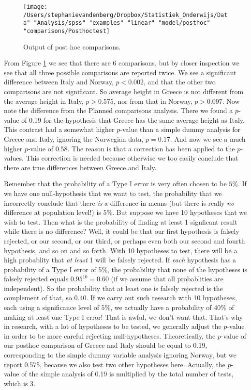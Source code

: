 \begin{figure}[h]
    \begin{center}
       \texttt{[image: /Users/stephanievandenberg/Dropbox/Statistiek\_Onderwijs/Data" "Analysis/spss" "examples" "linear" "model/posthoc" "comparisons/Posthoctest]}
    \end{center}
    \label{fig:Posthoctest}
    \caption{Output of post hoc comparisons.}
\end{figure}

From Figure \ref{fig:Posthoctest} we see that there are 6 comparisons, but by closer inspection we see that all three possible comparisons are reported twice. We see a significant difference between Italy and Norway, $p<0.002$, and that the other two comparisons are not significant. So average height in Greece is not different from the average height in Italy, $p>0.575$, nor from that in Norway, $p>0.097$.
Now note the difference from the Planned comparisons analysis. There we found a $p$-value of 0.19 for the hypothesis that Greece has the same average height as Italy. This contrast had a somewhat higher $p$-value than a simple dummy analysis for Greece and Italy, ignoring the Norwegian data, $p=0.17$. And now we see a much higher $p$-value of 0.58. The reason is that a correction has been applied to the $p$-values. This correction is needed because otherwise we too easily conclude that there are true differences between Greece and Italy.

Remember that the probability of a Type I error is very often chosen to be $5\%$. If we have one null-hypothesis that we want to test, the probability that we incorrectly conclude that there \textit{is} a difference in means (but there is really \textit{no} difference at population level!) is $5\%$. But suppose we have 10 hypotheses that we wish to test. Then what is the probability of finding at least 1 signficant result while there is no difference? Well, it could be that our first hypothesis is falsely rejected, or our second, or our third, or perhaps even both our second and fourth hypothesis, and so on and so forth. With 10 hypotheses to test, there will be a high probablity that \textit{at least} 1 will be falsely rejected. If \textit{each} hypothesis has a probability of a Type I error of 5\%, the probability that none of the hypotheses is falsely rejected equals $0.95^10=0.60$ (if we assume that all probablities are independent). So the probability that at least one is falsely rejected is the complement of that, so 0.40. If we carry out such research with 10 hypotheses, each using a significance level of $5\%$, we actually have a probability of 40\% of making at least one Type I error! That is awful, we don't want that. That's why in research, with a lot of hypotheses to be tested, we generally adjust the $p$-value in order to be more careful rejecting null-hypotheses. Theoretically, the $p$-value of our posthoc comparison of Greece and Italy should be equal to 0.19, corresponding to the simple dummy variable analysis ignoring Norway, but we report 0.575, because we also test two other hypotheses here. Actually, the $p$-value of the simple analysis of 0.19 is multiplied by the total number of tests, which is 3.



